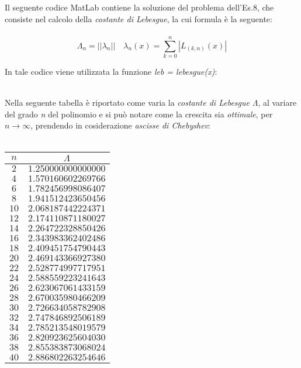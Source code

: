 Il seguente codice MatLab contiene la soluzione del problema dell'Es.8, che consiste nel calcolo della \textit{costante di Lebesgue}, la cui formula è la seguente:\\\
	\[
		\Lambda_n = ||\lambda_n|| \quad \lambda_n(x) = \sum_{k=0}^{n} |L_{(k,n)}(x)|
	\]
	
In tale codice viene utilizzata la funzione \textit{leb = lebesgue(x)}:\\\
	
Nella seguente tabella è riportato come varia la \textit{costante di Lebesgue} $\Lambda$, al variare del grado \textit{n} del polinomio e si può notare come la crescita sia \textit{ottimale}, per $n\rightarrow\infty$, prendendo in cosiderazione \textit{ascisse di Chebyshev}:\\\
	\begin{center}
		\begin{tabular}{|c|c|}
			\hline
				$n$ & $\Lambda$ \\
    		\hline
    			$2$  & $1.250000000000000$ \\ 
    			$4$  & $1.570160602269766$ \\ 
    			$6$  & $1.782456998086407$ \\ 
    			$8$  & $1.941512423650456$ \\ 
    			$10$ & $2.068187442224371$ \\ 
    			$12$ & $2.174110871180027$ \\ 
    			$14$ & $2.264722328850426$ \\ 
    			$16$ & $2.343983362402486$ \\ 
   				$18$ & $2.409451754790443$ \\ 
    			$20$ & $2.469143366927380$ \\ 
    			$22$ & $2.528774997717951$ \\ 
    			$24$ & $2.588559223241643$ \\ 
    			$26$ & $2.623067061433159$ \\ 
    			$28$ & $2.670035980466209$ \\ 
    			$30$ & $2.726634058782908$ \\ 
    			$32$ & $2.747846892506189$ \\ 
    			$34$ & $2.785213548019579$ \\ 
    			$36$ & $2.820923625604030$ \\ 
    			$38$ & $2.855383873068024$ \\ 
    			$40$ & $2.886802263254646$ \\ 
			\hline
		\end{tabular}
	\end{center}
